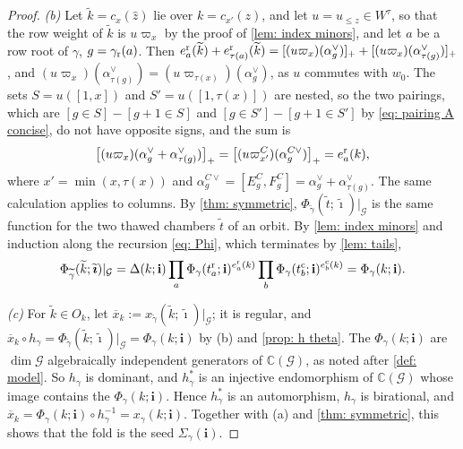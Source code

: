 \documentclass[a4paper]{amsart}
\numberwithin{equation}{section}
\theoremstyle{definition}
\theoremstyle{remark}
\newcommand{\bbC}{\mathbb{C}}
\newcommand{\mcG}{\mathcal{G}}
\newcommand{\bfi}{\mathbf{i}}
\newcommand{\tbfi}{\widetilde{\boldsymbol{\imath}}}
\newcommand{\tg}{\widetilde{\gamma}}
\newcommand{\rr}{{\rm r}}
\newcommand{\cc}{{\rm c}}
\begin{document}
\begin{proof}
  \emph{(b)}
  Let $\widetilde{k}=c_x(\widehat z)$ lie over $k=c_{x'}(z)$, and let $u=u_{\le z}\in W^\tau$, so that the row weight of $\widetilde{k}$ is $u\varpi_x$ by the proof of \cref{lem: index minors}, and let $a$ be a row root of $\gamma$, $g=\gamma_{\rr}(a)$.
  Then $e^\rr_a(\widetilde{k})+e^\rr_{\tau(a)}(\widetilde{k})=[(u\varpi_x)(\alpha_g^\vee)]_++[(u\varpi_x)(\alpha_{\tau(g)}^\vee)]_+$, and $(u\varpi_x)(\alpha^\vee_{\tau(g)})=(u\varpi_{\tau(x)})(\alpha^\vee_g)$, as $u$ commutes with $w_0$.
  The sets $S=u([1,x])$ and $S'=u([1,\tau(x)])$ are nested, so the two pairings, which are $[g\in S]-[g+1\in S]$ and $[g\in S']-[g+1\in S']$ by \eqref{eq: pairing A concise}, do not have opposite signs, and the sum is
  \[
    \big[(u\varpi_x)(\alpha_g^\vee+\alpha_{\tau(g)}^\vee)\big]_+=\big[(u\varpi^C_{x'})(\alpha^{C\vee}_g)\big]_+=e^\rr_a(k),
  \]
  where $x'=\min(x,\tau(x))$ and $\alpha^{C\vee}_g=[E^C_g,F^C_g]=\alpha^\vee_g+\alpha^\vee_{\tau(g)}$.
  The same calculation applies to columns.
  By \cref{thm: symmetric}, $\Phi_{\tg}(\widetilde{t};\tbfi)|_\mcG$ is the same function for the two thawed chambers $\widetilde{t}$ of an orbit.
  By \cref{lem: index minors} and induction along the recursion \eqref{eq: Phi}, which terminates by \cref{lem: tails},
  \[
    \Phi_{\tg}(\widetilde{k};\tbfi)|_\mcG=\Delta(k;\bfi)\prod_a\Phi_\gamma(t^\rr_a;\bfi)^{e^\rr_a(k)}\prod_b\Phi_\gamma(t^\cc_b;\bfi)^{e^\cc_b(k)}=\Phi_\gamma(k;\bfi).
  \]

  \emph{(c)}
  For $\widetilde{k}\in O_k$, let $\overline{x}_k:=x_{\tg}(\widetilde{k};\tbfi)|_\mcG$; it is regular, and $\overline{x}_k\circ h_\gamma=\Phi_{\tg}(\widetilde{k};\tbfi)|_\mcG=\Phi_\gamma(k;\bfi)$ by (b) and \cref{prop: h theta}.
  The $\Phi_\gamma(k;\bfi)$ are $\dim\mcG$ algebraically independent generators of $\bbC(\mcG)$, as noted after \cref{def: model}.
  So $h_\gamma$ is dominant, and $h_\gamma^*$ is an injective endomorphism of $\bbC(\mcG)$ whose image contains the $\Phi_\gamma(k;\bfi)$. Hence $h_\gamma^*$ is an automorphism, $h_\gamma$ is birational, and $\overline{x}_k=\Phi_\gamma(k;\bfi)\circ h_\gamma^{-1}=x_\gamma(k;\bfi)$.
  Together with (a) and \cref{thm: symmetric}, this shows that the fold is the seed $\Sigma_\gamma(\bfi)$.
\end{proof}
\end{document}
